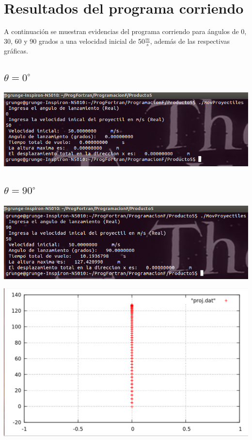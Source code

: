 \documentclass[notitlepage,12pt]{article}
\begin{document}
\section{Resultados del programa corriendo}
A continuaci\'on se muestran evidencias del programa corriendo para \'angulos de 0, 30, 60 y 90
grados a una velocidad inicial de 50$\frac{m}{s}$, adem\'as de las respectivas gr\'aficas.

\subsection{$\theta=0^{\circ}$}
\includegraphics[scale=0.5]{teta_0}


\subsection{$\theta=90^{\circ}$}
\includegraphics[scale=0.5]{teta_90}

\includegraphics[scale=0.3]{grafica_teta_90}
\end{document}
